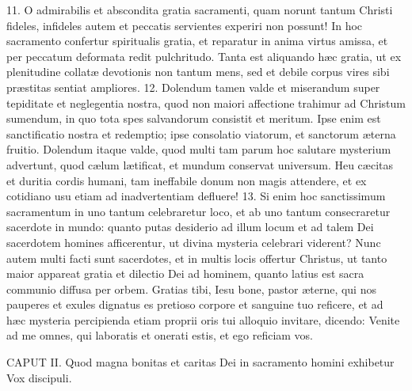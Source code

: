 11. O admirabilis et abscondita gratia sacramenti, quam norunt tantum Christi fideles, infideles autem et peccatis servientes experiri non possunt! In hoc sacramento confertur spiritualis gratia, et reparatur in anima virtus amissa, et per peccatum deformata redit pulchritudo. Tanta est aliquando hæc gratia, ut ex plenitudine collatæ devotionis non tantum mens, sed et debile corpus vires sibi præstitas sentiat ampliores.
12. Dolendum tamen valde et miserandum super tepiditate et neglegentia nostra, quod non maiori affectione trahimur ad Christum sumendum, in quo tota spes salvandorum consistit et meritum. Ipse enim est sanctificatio nostra et redemptio; ipse consolatio viatorum, et sanctorum æterna fruitio. Dolendum itaque valde, quod multi tam parum hoc salutare mysterium advertunt, quod cælum lætificat, et mundum conservat universum. Heu cæcitas et duritia cordis humani, tam ineffabile donum non magis attendere, et ex cotidiano usu etiam ad inadvertentiam defluere!
13. Si enim hoc sanctissimum sacramentum in uno tantum celebraretur loco, et ab uno tantum consecraretur sacerdote in mundo: quanto putas desiderio ad illum locum et ad talem Dei sacerdotem homines afficerentur, ut divina mysteria celebrari viderent? Nunc autem multi facti sunt sacerdotes, et in multis locis offertur Christus, ut tanto maior appareat gratia et dilectio Dei ad hominem, quanto latius est sacra communio diffusa per orbem. Gratias tibi, Iesu bone, pastor æterne, qui nos pauperes et exules dignatus es pretioso corpore et sanguine tuo reficere, et ad hæc mysteria percipienda etiam proprii oris tui alloquio invitare, dicendo: Venite ad me omnes, qui laboratis et onerati estis, et ego reficiam vos.


CAPUT II.
Quod magna bonitas et caritas Dei in sacramento homini exhibetur
Vox discipuli.

